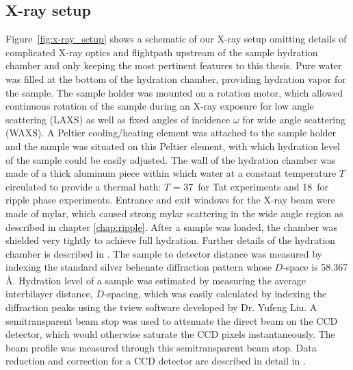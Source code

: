 \subsection{X-ray setup}
Figure~\ref{fig:x-ray_setup} shows a schematic of our X-ray setup
omitting details of complicated X-ray optics and flightpath upstream of the 
sample hydration chamber and only keeping the most pertinent features to 
this thesis.
Pure water was filled at the bottom of the hydration chamber, providing
hydration vapor for the sample.
The sample holder was mounted on a rotation motor, which allowed continuous 
rotation of the sample during an X-ray exposure for low angle scattering
(LAXS) as well as fixed angles of incidence $\omega$ for wide angle 
scattering (WAXS).
A Peltier cooling/heating element was attached to the sample holder and
the sample was situated on this Peltier element, with which hydration level of
the sample could be easily adjusted. 
The wall of the hydration chamber was made of a thick aluminum piece within which
water at a constant temperature $T$ circulated to provide a thermal bath:
$T$ = 37\textdegree\ for Tat experiments and 18\textdegree\ for ripple phase 
experiments.
Entrance and exit windows for the X-ray beam were made of mylar, which
caused strong mylar scattering in the wide angle region as described in
chapter \ref{chap:ripple}.
After a sample was loaded, the chamber was shielded very tightly
to achieve full hydration.
Further details of the hydration chamber is described in \cite{Kucerka05_BPJ}.
The sample to detector distance was measured by indexing the standard 
silver behenate diffraction pattern whose $D$-space is 58.367 \AA.
Hydration level of a sample was estimated by measuring the average 
interbilayer distance, $D$-spacing, which was easily calculated by indexing the 
diffraction peaks using the tview software developed by Dr. Yufeng Liu.
A semitransparent beam stop was used to attenuate the direct beam on the CCD
detector, 
which would otherwise saturate the CCD pixels instantaneously. 
The beam profile was measured through
this semitransparent beam stop. Data reduction and correction for a CCD 
detector are described in detail in \cite{Barna99}.

